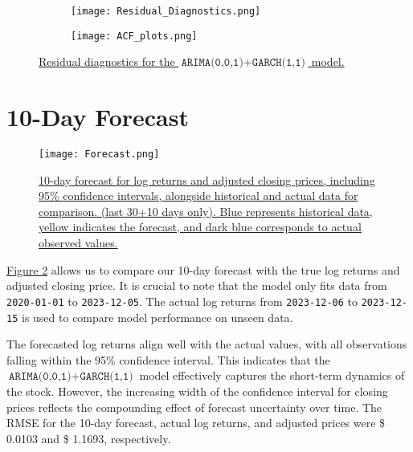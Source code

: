 \documentclass{article}
\newcommand{\1}{\mathbbm{1}}
\theoremstyle{definition}
\begin{document}
\begin{figure}[H]
\centering
\begin{subfigure}{\textwidth}
    \centering
    \texttt{[image: Residual\_Diagnostics.png]}
\end{subfigure}

\begin{subfigure}{\textwidth}
    \centering
    \texttt{[image: ACF\_plots.png]}
\end{subfigure}

\caption{\small{\hyperref[subsec:residual_diagnostics]{Residual diagnostics for the $\texttt{ARIMA(0,0,1)} + \texttt{GARCH(1,1)}$ model.}}}
\label{fig:residual_diagnostics}
\end{figure}










\section{10-Day Forecast}

\begin{figure}[H]
\centering
\texttt{[image: Forecast.png]}
\caption{\small{\hyperref[subsec:forecast]{10-day forecast for log returns and adjusted closing prices, including 95\% confidence intervals, alongside historical and actual data for comparison. (last 30+10 days only). Blue represents historical data, yellow indicates the forecast, and dark blue corresponds to actual observed values.}}}
\label{fig:forecast}
\end{figure}

\hyperref[fig:forecast]{Figure \ref{fig:forecast}} allows us to compare our 10-day forecast with the true log returns and adjusted closing price. It is crucial to note that the model only fits data from \texttt{2020-01-01} to \texttt{2023-12-05}. The actual log returns from \texttt{2023-12-06} to \texttt{2023-12-15} is used to compare model performance on unseen data.

The forecasted log returns align well with the actual values, with all observations falling within the 95\% confidence interval. This indicates that the $\texttt{ARIMA(0,0,1)} + \texttt{GARCH(1,1)}$ model effectively captures the short-term dynamics of the stock. However, the increasing width of the confidence interval for closing prices reflects the compounding effect of forecast uncertainty over time. The RMSE for the 10-day forecast, actual log returns, and adjusted prices were \$ 0.0103 and \$ 1.1693, respectively.
\end{document}

